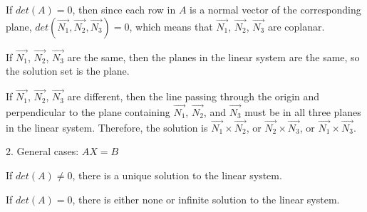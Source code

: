 \documentclass{article}
\begin{document}
If $det(A) = 0$, then since each row in $A$ is a normal vector of the 
corresponding plane, $det(\vec{N_1}, \vec{N_2}, \vec{N_3}) = 0$, which means 
that $\vec{N_1}$, $\vec{N_2}$, $\vec{N_3}$ are coplanar.

  If $\vec{N_1}$, $\vec{N_2}$, $\vec{N_3}$ are the same, then the planes in the 
  linear system are the same, so the solution set is the plane.

  If $\vec{N_1}$, $\vec{N_2}$, $\vec{N_3}$ are different, then the line passing 
  through the origin and perpendicular to the plane containing $\vec{N_1}$, 
  $\vec{N_2}$, and $\vec{N_3}$ must be in all three planes in the linear 
  system. Therefore, the solution is $\vec{N_1} \times \vec{N_2}$, or 
  $\vec{N_2} \times \vec{N_3}$, or $\vec{N_1} \times \vec{N_3}$.

2. General cases: $AX = B$

If $det(A) \neq 0$, there is a unique solution to the linear system.

If $det(A) = 0$, there is either none or infinite solution to the linear system.
\end{document}
